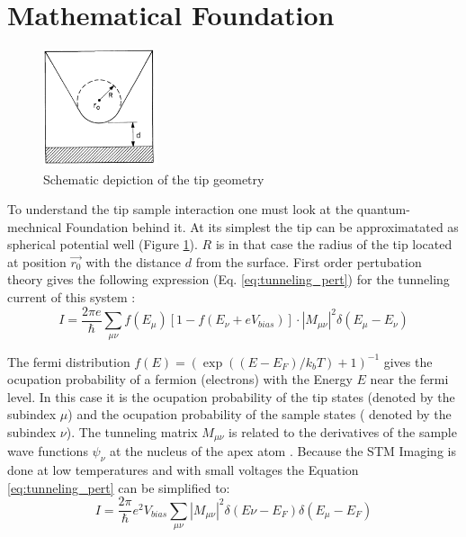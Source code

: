 \section{Mathematical Foundation}
\begin{figure}
    \centering
    \includegraphics[width=0.3\textwidth]{graphics/fundamental_tip_sheme.PNG}
    \caption{Schematic depiction of the tip geometry \cite{PhysRevLett}}
    \label{fig:tip_scheme}
\end{figure}
To understand the tip sample interaction one must look at the quantum-mechnical Foundation behind it.
At its simplest the tip can be approximatated as spherical potential well (Figure \ref{fig:tip_scheme}). $R$ is in that case the radius of the tip located at position $\vec{r_0}$ with the distance $d$ from the surface.
First order pertubation theory gives the following expression (Eq. \ref{eq:tunneling_pert}) for the tunneling current of this system \cite{PhysRevLett}:
\begin{equation}
    I = \frac{2 \pi e}{\hbar} \sum_{\mu \nu} f(E_{\mu})[1 - f(E_{\nu}+eV_{bias})]\cdot |M_{\mu \nu}|^2 \delta(E_{\mu}- E_{\nu})
    \label{eq:tunneling_pert}
\end{equation}
\newpage

The fermi distribution $f(E)= (\exp((E-E_F)/k_b T)+1)^{-1}$ gives the ocupation probability of a fermion (electrons) with the Energy $E$ near the fermi level.
In this case it is the ocupation probability of the tip states (denoted by the subindex $\mu$) and the ocupation probability of the sample states ( denoted by the subindex $\nu$).
The tunneling matrix $M_{\mu \nu}$ is related to the derivatives of the sample wave functions $\psi_{\nu} $ at the nucleus of the apex atom \cite{tunnelmatrix}.
Because the STM Imaging is done at low temperatures and with small voltages the Equation \ref{eq:tunneling_pert} can be simplified to:
\begin{equation}
    I = \frac{2 \pi}{\hbar} e^2 V_{bias} \sum_{\mu \nu}  |M_{\mu \nu}|^2 \delta(E{\nu}-E_F) \delta(E_{\mu}- E_{F})
    \label{eq:tunneling_pert_simple}
\end{equation}





\newpage